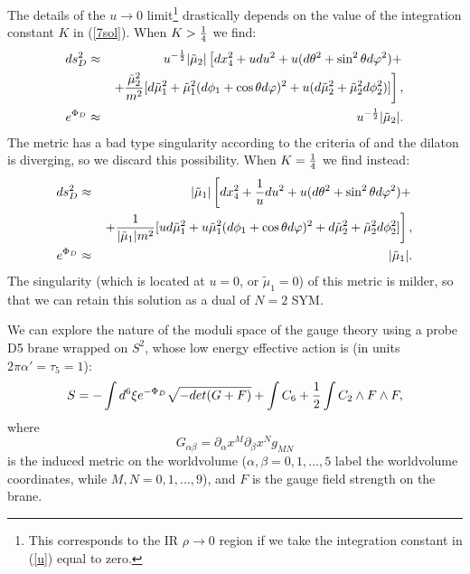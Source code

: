 \documentclass[a4paper,12pt]{article}
\begin{document}
The details of the $u\rightarrow 0$ limit\footnote{This corresponds to the IR $\rho \rightarrow 0$ region if we take the integration constant in (\ref{u}) equal to zero.} drastically depends on the value of the integration constant $K$ in (\ref{7sol}). When $K>{1\over4}$ we find:
\begin{eqnarray}
ds^{2}_{D}&\approx& u^{-{1\over2}}|\tilde{\mu}_{2}| \left[ dx_{4}^2 + udu^2 + u(d\theta^2 + \sin^{2}\theta d\varphi^2)+ \right. \nonumber \\
&&\left. +{{\tilde\mu}_{2}^{2}\over m^2}[d{\tilde\mu}_{1}^{2}+{\tilde\mu}_{1}^{2}(d\phi_{1}+ \cos\theta d\varphi)^2 +
 u(d{\tilde\mu}_{2}^{2}+{\tilde\mu}_{2}^{2}d\phi_{2}^{2})] \right], \nonumber \\
e^{\Phi_{D}}&\approx& u^{-{1\over2}}|\tilde{\mu}_{2}|.
\label{IR}
\end{eqnarray}
The metric has a bad type singularity according to the criteria of \cite{mn1} and the dilaton is diverging, so we discard this possibility. When $K={1\over4}$ we find instead:
\begin{eqnarray}
ds^{2}_{D}&\approx& |\tilde{\mu}_{1}|\left[ dx_{4}^2 + {1\over u}du^2 + u(d\theta^2 + \sin^{2}\theta d\varphi^2)+ \right. \nonumber \\
&& \left.+ {1\over{|{\tilde\mu}_{1}|m^2}}[ud{\tilde\mu}_{1}^{2}+u{\tilde\mu}_{1}^{2}(d\phi_{1}+ \cos\theta d\varphi)^{2}+ d{\tilde\mu}_{2}^{2}+{\tilde\mu}_{2}^{2}d\phi_{2}^{2}] \right], \nonumber \\
 e^{\Phi_{D}}&\approx& |\tilde{\mu}_{1}|.
\label{IRft}
\end{eqnarray}
The singularity (which is located at $u=0$, or $\tilde\mu_{1}=0$) of this metric is milder, so that we can retain this solution as a dual of $N=2$ SYM.

We can explore the nature of the moduli space of the gauge theory using
a probe D5 brane wrapped on $S^{2}$, whose low energy effective action is (in units $2\pi\alpha'= \tau_{5}=1$):
\begin{equation}
S=-\int d^{6}\xi e^{-\Phi_{D}}\sqrt{-det(G+F)} + \int C_{6} +{1\over2} \int C_{2}\wedge F\wedge F ,
\label{azione}
\end{equation}
where
\begin{equation}
G_{\alpha\beta}=\partial_{\alpha}x^{M}\partial_{\beta}x^{N}g_{MN}
\end{equation}
is the induced metric on the worldvolume ($\alpha, \beta=0,1,...,5$ label the worldvolume coordinates, while $M,N=0,1,...,9$), and $F$ is the gauge field strength on the brane.
\end{document}
